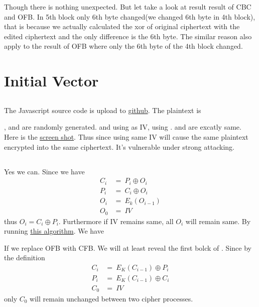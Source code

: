 \documentclass{article}
\begin{document}
Though there is nothing unexpected. But let take a look at result result of CBC and OFB. In 5th block only 6th byte changed(we changed 6th byte in 4th block), that is because we actually calculated the xor of original ciphertext with the edited ciphertext
and the only difference is the 6th byte. The similar reason also apply to the result of OFB where only the 6th byte of the 4th block changed.
\section{Initial Vector}
\subsection{}
The Javascript source code is upload to
\href{https://github.com/Luna1996/WUSTL/blob/master/571/L2/task41.js}{github}.
The plaintext is
\begin{center}
\end{center}
,  and  are randomly generated.  and  using  as IV,  using .  and  are excatly same. Here is the \href{https://i.loli.net/2018/09/25/5ba9b6889cf97.png}{screen shot}. Thus since using same IV will cause the same plaintext encrypted into the same ciphertext. It's vulnerable under strong attacking.
\subsection{}
Yes we can. Since we have
$$
	\begin{aligned}
		C_i & =\ P_i\oplus O_i \\
		P_i & =\ C_i\oplus O_i \\
		O_i & =\ E_k(O_{i-1})  \\
		O_0 & =\ IV
	\end{aligned}
$$
thus $O_i = C_i\oplus P_i$. Furthermore if IV remains same, all $O_i$ will remain same. By running \href{https://github.com/Luna1996/WUSTL/blob/master/571/L2/task42.js}{this algorithm}. We have
\begin{center}
\end{center}
If we replace OFB with CFB. We will at least reveal the first bolck of . Since by the definition
$$
	\begin{aligned}
		C_i & =\ E_K(C_{i-1})\oplus P_i \\
		P_i & =\ E_K(C_{i-1})\oplus C_i \\
		C_0 & =\ IV
	\end{aligned}
$$
only $C_0$ will remain unchanged between two cipher processes.
\end{document}
